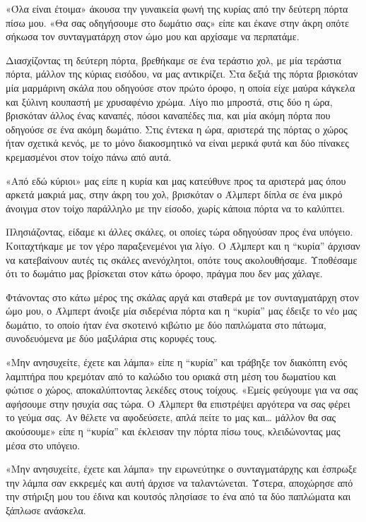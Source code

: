 \documentclass[12pt,twoside, openany]{book}
\begin{document}
«Όλα είναι έτοιμα» άκουσα την γυναικεία φωνή της κυρίας από την δεύτερη πόρτα πίσω μου. «Θα σας οδηγήσουμε στο δωμάτιο σας» είπε και έκανε στην άκρη οπότε σήκωσα τον συνταγματάρχη στον ώμο μου και αρχίσαμε να περπατάμε.

Διασχίζοντας τη δεύτερη πόρτα, βρεθήκαμε σε ένα τεράστιο χολ, με μία τεράστια πόρτα, μάλλον της κύριας εισόδου, να μας αντικρίζει. Στα δεξιά της πόρτα βρισκόταν μία μαρμάρινη σκάλα που οδηγούσε στον πρώτο όροφο, η οποία είχε μαύρα κάγκελα και ξύλινη κουπαστή με χρυσαφένιο χρώμα. Λίγο πιο μπροστά, στις δύο η ώρα, βρισκόταν άλλος ένας καναπές, πόσοι καναπέδες πια, και μία ακόμη πόρτα που οδηγούσε σε ένα ακόμη δωμάτιο. Στις έντεκα η ώρα, αριστερά της πόρτας  ο χώρος ήταν σχετικά κενός, με το μόνο διακοσμητικό να είναι μερικά φυτά και δύο πίνακες κρεμασμένοι στον τοίχο πάνω από αυτά.

«Από εδώ κύριοι» μας είπε η κυρία και μας κατεύθυνε προς τα αριστερά μας όπου αρκετά μακριά μας, στην άκρη του χολ, βρισκόταν ο Άλμπερτ δίπλα σε ένα μικρό άνοιγμα στον τοίχο παράλληλο με την είσοδο, χωρίς κάποια πόρτα να το καλύπτει.

Πλησιάζοντας, είδαμε κι άλλες σκάλες, οι οποίες τώρα οδηγούσαν προς ένα υπόγειο. Κοιταχτήκαμε με τον γέρο παραξενεμένοι για λίγο. Ο Άλμπερτ και η “κυρία” άρχισαν να κατεβαίνουν αυτές τις σκάλες ανενόχλητοι, οπότε τους ακολουθήσαμε. Υποθέσαμε ότι το δωμάτιο μας βρίσκεται στον κάτω όροφο, πράγμα που δεν μας χάλαγε.

Φτάνοντας στο κάτω μέρος της σκάλας αργά και σταθερά με τον συνταγματάρχη στον ώμο μου, ο Άλμπερτ άνοιξε μία σιδερένια πόρτα και η “κυρία” μας έδειξε το νέο μας δωμάτιο, το οποίο ήταν ένα σκοτεινό κιβώτιο με δύο παπλώματα στο πάτωμα, συνοδευόμενα με δύο μαξιλάρια στις κορυφές τους.

«Μην ανησυχείτε, έχετε και λάμπα» είπε η “κυρία” και τράβηξε τον διακόπτη ενός λαμπτήρα που κρεμόταν από το καλώδιο του οριακά στη μέση του δωματίου και φώτισε ο χώρος, αποκαλύπτοντας λεκέδες στους τοίχους. «Εμείς φεύγουμε για να σας αφήσουμε στην ησυχία σας τώρα. Ο Άλμπερτ θα επιστρέψει αργότερα να σας φέρει το γεύμα σας. Αν θέλετε να αφοδεύσετε, απλά πείτε το μας και… μάλλον θα σας ακούσουμε» είπε η “κυρία” και έκλεισαν την πόρτα πίσω τους, κλειδώνοντας μας μέσα στο υπόγειο.

«Μην ανησυχείτε, έχετε και λάμπα» την ειρωνεύτηκε ο συνταγματάρχης και έσπρωξε την λάμπα σαν εκκρεμές και αυτή άρχισε να ταλαντώνεται. Ύστερα, αποχώρησε από την στήριξη μου του έδινα και κουτσός πλησίασε το ένα από τα δύο παπλώματα και ξάπλωσε ανάσκελα.
\end{document}
